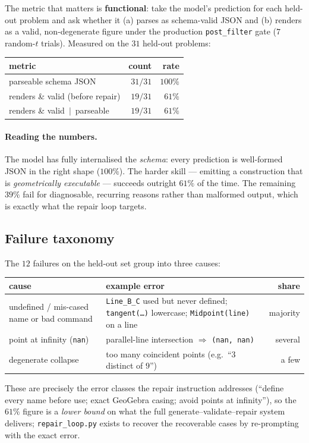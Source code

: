 \documentclass[11pt]{article}
\newcommand{\code}[1]{\texttt{\small #1}}
\begin{document}
The metric that matters is \textbf{functional}: take the model's prediction for
each held-out problem and ask whether it (a) parses as schema-valid JSON and
(b) renders as a valid, non-degenerate figure under the production
\code{post\_filter} gate ($7$ random-$t$ trials). Measured on the $31$ held-out
problems:

\begin{center}
\begin{tabular}{@{}lrr@{}}
\toprule
\textbf{metric} & \textbf{count} & \textbf{rate}\\
\midrule
parseable schema JSON               & $31/31$ & $100\%$\\
renders \& valid (before repair)    & $19/31$ & $61\%$\\
renders \& valid \,$|$\, parseable  & $19/31$ & $61\%$\\
\bottomrule
\end{tabular}
\end{center}

\paragraph{Reading the numbers.} The model has fully internalised the
\emph{schema}: every prediction is well-formed JSON in the right shape ($100\%$).
The harder skill --- emitting a construction that is \emph{geometrically
executable} --- succeeds outright $61\%$ of the time. The remaining $39\%$ fail
for diagnosable, recurring reasons rather than malformed output, which is
exactly what the repair loop targets.

\subsection{Failure taxonomy}
The $12$ failures on the held-out set group into three causes:
\begin{center}
\begin{tabular}{@{}lp{8.6cm}r@{}}
\toprule
\textbf{cause} & \textbf{example error} & \textbf{share}\\
\midrule
undefined / mis-cased name or bad command &
  \code{Line\_B\_C} used but never defined; \code{tangent(\dots)} lowercase;
  \code{Midpoint(line)} on a line &  majority\\
point at infinity (\code{nan}) &
  parallel-line intersection $\Rightarrow$ \code{(nan, nan)} &  several\\
degenerate collapse &
  too many coincident points (e.g.\ ``$3$ distinct of $9$'') &  a few\\
\bottomrule
\end{tabular}
\end{center}
These are precisely the error classes the repair instruction addresses (``define
every name before use; exact GeoGebra casing; avoid points at infinity''), so
the $61\%$ figure is a \emph{lower bound} on what the full
generate--validate--repair system delivers; \code{repair\_loop.py} exists to
recover the recoverable cases by re-prompting with the exact error.
\end{document}
